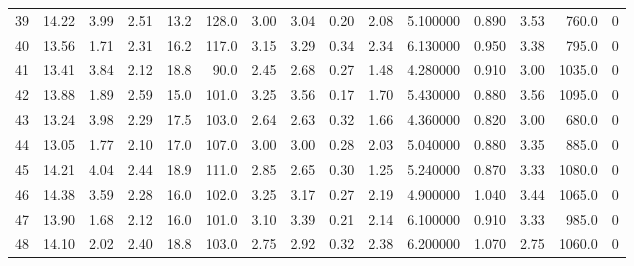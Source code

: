 \documentclass{article}
\begin{document}
\begin{tabular}{lrrrrrrrrrrrrrr}
    39  &    14.22 &        3.99 &  2.51 &               13.2 &      128.0 &           3.00 &        3.04 &                  0.20 &             2.08 &         5.100000 &  0.890 &                          3.53 &    760.0 &      0 \\
    40  &    13.56 &        1.71 &  2.31 &               16.2 &      117.0 &           3.15 &        3.29 &                  0.34 &             2.34 &         6.130000 &  0.950 &                          3.38 &    795.0 &      0 \\
    41  &    13.41 &        3.84 &  2.12 &               18.8 &       90.0 &           2.45 &        2.68 &                  0.27 &             1.48 &         4.280000 &  0.910 &                          3.00 &   1035.0 &      0 \\
    42  &    13.88 &        1.89 &  2.59 &               15.0 &      101.0 &           3.25 &        3.56 &                  0.17 &             1.70 &         5.430000 &  0.880 &                          3.56 &   1095.0 &      0 \\
    43  &    13.24 &        3.98 &  2.29 &               17.5 &      103.0 &           2.64 &        2.63 &                  0.32 &             1.66 &         4.360000 &  0.820 &                          3.00 &    680.0 &      0 \\
    44  &    13.05 &        1.77 &  2.10 &               17.0 &      107.0 &           3.00 &        3.00 &                  0.28 &             2.03 &         5.040000 &  0.880 &                          3.35 &    885.0 &      0 \\
    45  &    14.21 &        4.04 &  2.44 &               18.9 &      111.0 &           2.85 &        2.65 &                  0.30 &             1.25 &         5.240000 &  0.870 &                          3.33 &   1080.0 &      0 \\
    46  &    14.38 &        3.59 &  2.28 &               16.0 &      102.0 &           3.25 &        3.17 &                  0.27 &             2.19 &         4.900000 &  1.040 &                          3.44 &   1065.0 &      0 \\
    47  &    13.90 &        1.68 &  2.12 &               16.0 &      101.0 &           3.10 &        3.39 &                  0.21 &             2.14 &         6.100000 &  0.910 &                          3.33 &    985.0 &      0 \\
    48  &    14.10 &        2.02 &  2.40 &               18.8 &      103.0 &           2.75 &        2.92 &                  0.32 &             2.38 &         6.200000 &  1.070 &                          2.75 &   1060.0 &      0 \\

\end{tabular}
\end{document}
